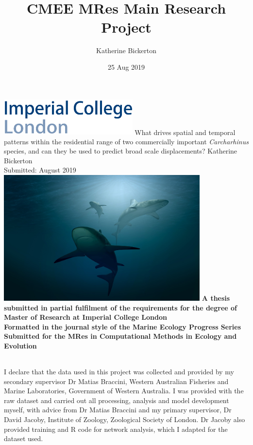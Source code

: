 \documentclass[11pt,a4paper]{article}
\title{CMEE MRes Main Research Project}
\date{25 Aug 2019}
\author{Katherine Bickerton}
\begin{document}
	
	\begin{titlepage}
		\centering
		\includegraphics[width = 7cm,left]{../Results/imperial_logo.png}
		{\Large
			\vskip2cm
			What drives spatial and temporal patterns within the residential range of two commercially important \textit{Carcharhinus} species, and can they be used to predict broad scale displacements?
		}    
		\vskip1cm	
		{\large Katherine Bickerton\\
		Submitted: August 2019}
		\vskip2cm	
		\includegraphics[width = 0.8\textwidth]{../Results/cover_image.jpg}
		\vskip3cm		
		\textbf{A thesis submitted in partial fulfilment of the requirements for the degree of Master of Research at Imperial College London\\
		Formatted in the journal style of the Marine Ecology Progress Series\\
		Submitted for the MRes in Computational Methods in Ecology and Evolution\\}
		\vspace*{\fill}
		\vspace*{\fill}
	\end{titlepage}
	
	
	\newpage
	
	\\
	
	\noindent
	I declare that the data used in this project was collected and provided by my secondary supervisor Dr Matias Braccini, Western Australian Fisheries and Marine Laboratories, Government of Western Australia. I was provided with the raw dataset and carried out all processing, analysis and model development myself, with advice from Dr Matias Braccini and my primary supervisor, Dr David Jacoby, Institute of Zoology, Zoological Society of London. Dr Jacoby also provided training and R code for network analysis, which I adapted for the dataset used.
	
\end{document}

